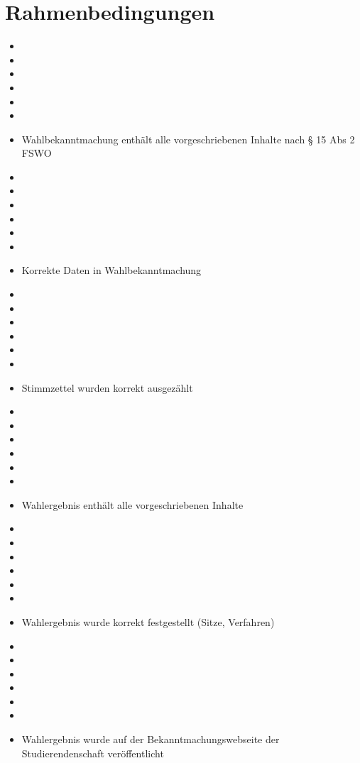 \documentclass[a4paper]{scrartcl}
\newcommand{\fullcheck}{\raisebox{-.8\dp\strutbox}{\texttt{[image: Check.pdf]}}}
\newcommand{\semicheck}{\raisebox{-.8\dp\strutbox}{\texttt{[image: Semicheck.pdf]}}}
\newcommand{\nocheck}{\raisebox{-.8\dp\strutbox}{\texttt{[image: Nocheck.pdf]}}}
\newcommand{\dontknow}{\raisebox{-.8\dp\strutbox}{\texttt{[image: Dontknow.pdf]}}}
\newcommand{\notrev}{\raisebox{-.8\dp\strutbox}{\texttt{[image: Notrev.pdf]}}}
\newcommand{\sym}[1]{
\ifcase#1 \item[$\Box$]
\or \item[\fullcheck]
\or \item[\semicheck]
\or \item[\nocheck]
\or \item[\dontknow]
\or \item[\notrev]
\else \item[$\Box$]
\fi}
\begin{document}






\section{Rahmenbedingungen}
\begin{itemize}[label=$\Box$]
\sym{0} Wahlbekanntmachung enthält alle vorgeschriebenen Inhalte nach § 15 Abs 2 FSWO
\sym{0} Korrekte Daten in Wahlbekanntmachung %
\sym{0} Stimmzettel wurden korrekt ausgezählt %
\sym{0} Wahlergebnis enthält alle vorgeschriebenen Inhalte %
\sym{0} Wahlergebnis wurde korrekt festgestellt (Sitze, Verfahren) %
\sym{0} Wahlergebnis wurde auf der Bekanntmachungswebseite der Studierendenschaft veröffentlicht %
\end{itemize}






\end{document}
